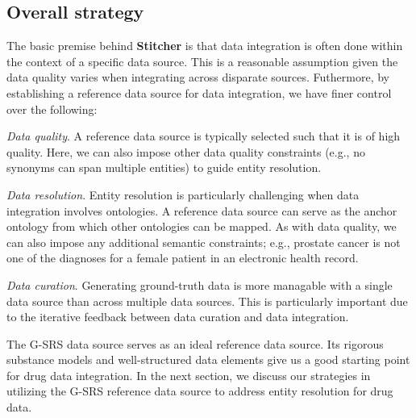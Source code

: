 \documentclass{bioinfo}
\newcommand\st{\textbf{Stitcher}}
\begin{document}
\subsection{Overall strategy}
The basic premise behind \st{} is that data integration is often done
within the context of a specific data source. This is a reasonable
assumption given the data quality varies when integrating across
disparate sources. Futhermore, by establishing a reference data source
for data integration, we have finer control over the following: 
\begin{unlist}
\item{\emph{Data quality}.} A reference data source is typically
selected such that it is of high quality. Here, we can also impose
other data quality constraints (e.g., no synonyms can span multiple
entities) to guide entity resolution. 
\item{\emph{Data resolution}.} Entity resolution is particularly
challenging when data integration involves ontologies. A reference
data source can serve as the anchor ontology from which other
ontologies can be mapped. As with data quality, we can also impose any
additional semantic constraints; e.g., prostate cancer is not one of
the diagnoses for a female patient in an electronic health record. 
\item{\emph{Data curation}.} Generating ground-truth data is more
managable with a single data source than across multiple data sources.
This is particularly important due to the iterative feedback between
data curation and data integration. 
\end{unlist}
The G-SRS data source serves as an ideal reference data source. Its
rigorous substance models and well-structured data elements give us a
good starting point for drug data integration. In the next section, we
discuss our strategies in utilizing the G-SRS reference data source to
address entity resolution for drug data. 
\end{document}
